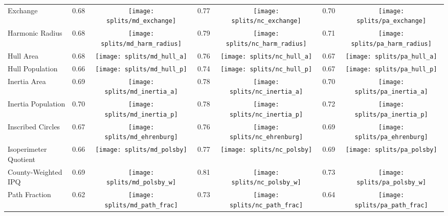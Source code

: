 \begin{table}
\begin{tabular}{lcccccc}
Exchange               &     0.68 &     \texttt{[image: splits/md\_exchange]} &           0.77 &     \texttt{[image: splits/nc\_exchange]} &         0.70 &     \texttt{[image: splits/pa\_exchange]} \\
Harmonic Radius        &     0.68 &  \texttt{[image: splits/md\_harm\_radius]} &           0.79 &  \texttt{[image: splits/nc\_harm\_radius]} &         0.71 &  \texttt{[image: splits/pa\_harm\_radius]} \\
Hull Area              &     0.68 &       \texttt{[image: splits/md\_hull\_a]} &           0.76 &       \texttt{[image: splits/nc\_hull\_a]} &         0.67 &       \texttt{[image: splits/pa\_hull\_a]} \\
Hull Population        &     0.66 &       \texttt{[image: splits/md\_hull\_p]} &           0.74 &       \texttt{[image: splits/nc\_hull\_p]} &         0.67 &       \texttt{[image: splits/pa\_hull\_p]} \\
Inertia Area           &     0.69 &    \texttt{[image: splits/md\_inertia\_a]} &           0.78 &    \texttt{[image: splits/nc\_inertia\_a]} &         0.70 &    \texttt{[image: splits/pa\_inertia\_a]} \\
Inertia Population     &     0.70 &    \texttt{[image: splits/md\_inertia\_p]} &           0.78 &    \texttt{[image: splits/nc\_inertia\_p]} &         0.72 &    \texttt{[image: splits/pa\_inertia\_p]} \\
Inscribed Circles      &     0.67 &    \texttt{[image: splits/md\_ehrenburg]} &           0.76 &    \texttt{[image: splits/nc\_ehrenburg]} &         0.69 &    \texttt{[image: splits/pa\_ehrenburg]} \\
Isoperimeter Quotient  &     0.66 &       \texttt{[image: splits/md\_polsby]} &           0.77 &       \texttt{[image: splits/nc\_polsby]} &         0.69 &       \texttt{[image: splits/pa\_polsby]} \\
County-Weighted IPQ    &     0.69 &     \texttt{[image: splits/md\_polsby\_w]} &           0.81 &     \texttt{[image: splits/nc\_polsby\_w]} &         0.73 &     \texttt{[image: splits/pa\_polsby\_w]} \\
Path Fraction          &     0.62 &    \texttt{[image: splits/md\_path\_frac]} &           0.73 &    \texttt{[image: splits/nc\_path\_frac]} &         0.64 &    \texttt{[image: splits/pa\_path\_frac]} \\

\end{tabular}
\end{table}

